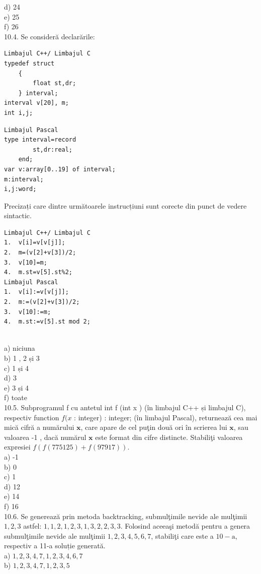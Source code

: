 d) 24
\\
e) 25
\\
f) 26
\\
10.4. Se consideră declarările:
\begin{verbatim}
Limbajul C++/ Limbajul C
typedef struct
    {
        float st,dr;
    } interval;
interval v[20], m;
int i,j;
\end{verbatim}
\begin{verbatim}
Limbajul Pascal
type interval=record
        st,dr:real;
    end;
var v:array[0..19] of interval;
m:interval;
i,j:word;
\end{verbatim}
Precizați care dintre următoarele instrucțiuni sunt corecte din punct de vedere sintactic.
\begin{verbatim}
Limbajul C++/ Limbajul C
1.  v[i]=v[v[j]]; 
2.  m=(v[2]+v[3])/2; 
3.  v[10]=m; 
4.  m.st=v[5].st%2;
Limbajul Pascal
1.  v[i]:=v[v[j]]; 
2.  m:=(v[2]+v[3])/2; 
3.  v[10]:=m; 
4.  m.st:=v[5].st mod 2;
\end{verbatim}
\\
a) niciuna
\\
b) 1 , 2 și 3
\\
c) 1 și 4
\\
d) 3
\\
e) 3 și 4
\\
f) toate
\\
10.5. Subprogramul f cu antetul int f (int x ) (în limbajul C++ și limbajul C), respectiv function $f(x$ : integer) : integer; (în limbajul Pascal), returnează cea mai mică cifră a numărului $\mathbf{x}$, care apare de cel puţin două ori în scrierea lui $\mathbf{x}$, sau valoarea -1 , dacă numărul $\mathbf{x}$ este format din cifre distincte.
Stabiliţi valoarea expresiei $f(f(775125)+f(97917))$.
\\
a) -1
\\
b) 0
\\
c) 1
\\
d) 12
\\
e) 14
\\
f) 16
\\
10.6. Se generează prin metoda backtracking, submulţimile nevide ale mulţimii ${1,2,3}$ astfel: ${1},{1,2},{1,2,3},{1,3},{2},{2,3},{3}$. Folosind aceeaşi metodă pentru a genera submulţimile nevide ale mulţimii ${1,2,3,4,5,6,7}$, stabiliţi care este a $10-\mathrm{a}$, respectiv a 11-a soluție generată.
\\
a) ${1,2,3,4,7}, {1,2,3,4,6,7}$
\\
b) ${1,2,3,4,7},{1,2,3,5}$
\\
